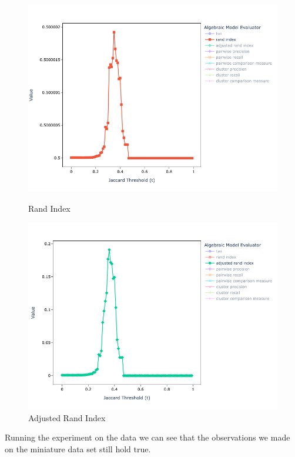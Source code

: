 \documentclass[11pt]{article}
\begin{document}
\begin{figure}[h!]
\begin{minipage}{0.49\textwidth}
            \includegraphics[width=\textwidth]{full-alg-rand}
            \caption{Rand Index}
            \label{fig:full-alg-rand}
        \end{minipage}    
        \begin{minipage}{0.49\textwidth}
            \centering
            \includegraphics[width=\textwidth]{full-alg-adj-rand}
            \caption{Adjusted Rand Index}
            \label{fig:full-alg-adj-rand}
        \end{minipage}    
    \end{figure}\label{abt-buy-full}
    
    Running the experiment on the data we can see that the observations we made
    on the miniature data set still hold true.
\end{document}
